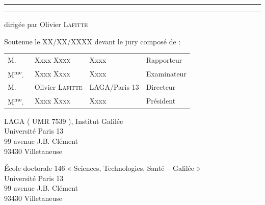 \begin{titlepage}
\begin{center}
\hrule
{}
{\LARGE \textbf{\doctitle}}
\hrule

{\Large
dirigée par Olivier \textsc{Lafitte}}


{\Large Soutenue le XX/XX/XXXX devant le jury composé de :}

{\Large
\begin{tabular}{l@{\hskip 0cm}lll}
M.&Xxxx \textsc{Xxxx} & Xxxx & Rapporteur\\
M\textsuperscript{me}.~&Xxxx \textsc{Xxxx} & Xxxx & Examinateur\\
M.&Olivier \textsc{Lafitte} & LAGA/Paris 13 & Directeur\\
M\textsuperscript{me}.~&Xxxx \textsc{Xxxx} & Xxxx & Président\\
\end{tabular}
}

\end{center}


\newpage

\vspace*{\fill}

\noindent
\begin{center}
\begin{minipage}[t]{0.45\textwidth}
LAGA ( UMR 7539 ), Institut Galilée\\
Université Paris 13 \\
99 avenue J.B. Clément \\
93430 Villetaneuse
\end{minipage}%
%
\hfill%
%
\begin{minipage}[t]{0.45\textwidth}
École doctorale 146 « Sciences, Technologies, Santé – Galilée » \\
Université Paris 13 \\
99 avenue J.B. Clément \\
93430 Villetaneuse
\end{minipage}
\end{center}



\end{titlepage}
\hypersetup{pageanchor=true}

\cleardoublepage